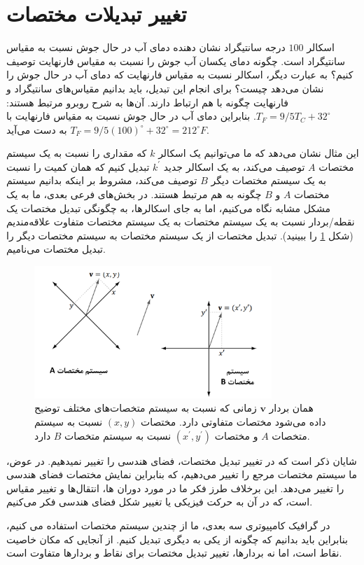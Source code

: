 \section{\textbf{تغییر تبدیلات مختصات}}
\label{sec:3.4}
{
    \Large
    \begin{spacing}{1.5}
        اسکالر $100$ درجه سانتیگراد نشان دهنده دمای آب در حال جوش نسبت به مقیاس سانتیگراد است.
        چگونه دمای یکسان آب جوش را نسبت به مقیاس فارنهایت توصیف کنیم؟ به عبارت دیگر، اسکالر نسبت به مقیاس فارنهایت که دمای آب در حال جوش را نشان می‌دهد چیست؟ برای انجام این تبدیل، باید بدانیم مقیاس‌های سانتیگراد و فارنهایت چگونه با هم ارتباط دارند.
        آن‌ها به شرح روبرو مرتبط هستند:
        $T_{F}=9/5T_{C}+32^\circ$. بنابراین دمای آب در حال جوش نسبت به مقیاس فارنهایت با $T_{F}=9/5(100)^\circ+32^\circ=212^\circ F$ به دست می‌آید.

        این مثال نشان می‌دهد که ما می‌توانیم یک اسکالر $k$ که مقداری را نسبت به یک سیستم مختصات $A$ توصیف می‌کند،
        به یک اسکالر جدید $k^\prime$ تبدیل کنیم که همان کمیت را نسبت به یک سیستم مختصات دیگر $B$ توصیف می‌کند،
        مشروط بر اینکه بدانیم سیستم مختصات $A$ و  $B$ چگونه به هم مرتبط هستند.
        در بخش‌های فرعی بعدی، ما به یک مشکل مشابه نگاه می‌کنیم، اما به جای اسکالرها، به چگونگی تبدیل مختصات یک نقطه/بردار نسبت به یک سیستم مختصات به یک سیستم مختصات متفاوت علاقه‌مندیم (شکل \ref{fig:4.Session.1.3.10} را ببینید).
        تبدیل مختصات از یک سیستم مختصات به سیستم مختصات دیگر را تبدیل مختصات می‌نامیم.
        \begin{figure}[H]
            \centering
            \setlength{\belowcaptionskip}{-10pt}
            \includegraphics[width=0.8\textwidth]{Images/4/3/4.Session.1.3.10}
            \caption {همان بردار $\textbf{v}$ زمانی که نسبت به سیستم متخصات‌های مختلف توضیح داده می‌شود مختصات متفاوتی دارد. مختصات $(x, y)$ نسبت به سیستم متخصات $A$ و مختصات $(x^\prime, y^\prime)$ نسبت به سیستم متخصات $B$ دارد.}
            \label{fig:4.Session.1.3.10}
        \end{figure}
        شایان ذکر است که در تغییر تبدیل مختصات، فضای هندسی را تغییر نمیدهیم. در عوض، ما سیستم مختصات مرجع را تغییر می‌دهیم، که بنابراین نمایش مختصات فضای هندسی را تغییر می‌دهد.
        این برخلاف طرز فکر ما در مورد دوران ها، انتقال‌ها و تغییر مقیاس است، که در آن به حرکت فیزیکی یا تغییر شکل فضای هندسی فکر می‌کنیم.

        در گرافیک کامپیوتری سه بعدی، ما از چندین سیستم مختصات استفاده می کنیم، بنابراین باید بدانیم که چگونه از یکی به دیگری تبدیل کنیم.
        از آنجایی که مکان خاصیت نقاط است، اما نه بردارها، تغییر تبدیل مختصات برای نقاط و بردارها متفاوت است.
    \end{spacing}
}

